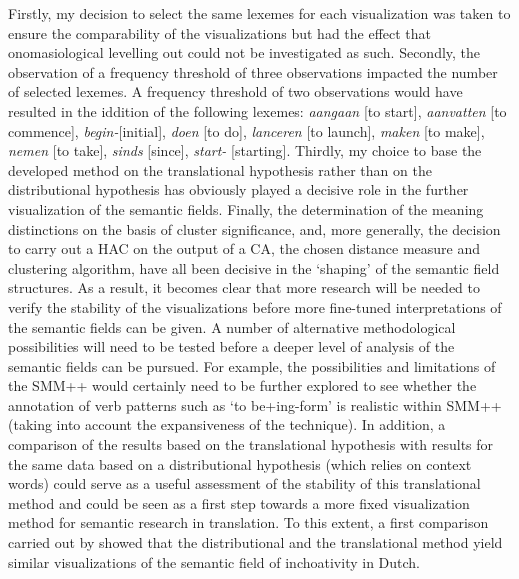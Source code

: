 Firstly, my decision to select the same lexemes for each visualization was taken to ensure the comparability of the visualizations but had the effect that onomasiological levelling out could not be investigated as such. Secondly, the observation of a frequency threshold of three observations impacted the number of selected lexemes. A frequency threshold of two observations would have resulted in the iddition of the following lexemes: \textit{aangaan} [to start], \textit{aanvatten} [to commence], \textit{begin-}[initial], \textit{doen} [to do], \textit{lanceren} [to launch], \textit{maken} [to make], \textit{nemen} [to take], \textit{sinds} [since], \textit{start-} [starting]. Thirdly, my choice to base the developed method on the translational hypothesis rather than on the distributional hypothesis has obviously played a decisive role in the further visualization of the semantic fields. Finally, the determination of the meaning distinctions on the basis of cluster significance, and, more generally, the decision to carry out a HAC on the output of a CA, the chosen distance measure and clustering algorithm, have all been decisive in the ‘shaping’ of the semantic field structures. As a result, it becomes clear that more research will be needed to verify the stability of the visualizations before more fine-tuned interpretations of the semantic fields can be given. A number of alternative methodological possibilities will need to be tested before a deeper level of analysis of the semantic fields can be pursued. For example, the possibilities and limitations of the SMM++ would certainly need to be further explored to see whether the annotation of verb patterns such as ‘to be+ing-form’ is realistic within SMM++ (taking into account the expansiveness of the technique). In addition, a comparison of the results based on the translational hypothesis with results for the same data based on a distributional hypothesis (which relies on context words) could serve as a useful assessment of the stability of this translational method and could be seen as a first step towards a more fixed visualization method for semantic research in translation. To this extent, a first comparison carried out by \citet{vandevoorde_distributional_2016} showed that the distributional and the translational method yield similar visualizations of the semantic field of inchoativity in Dutch.



